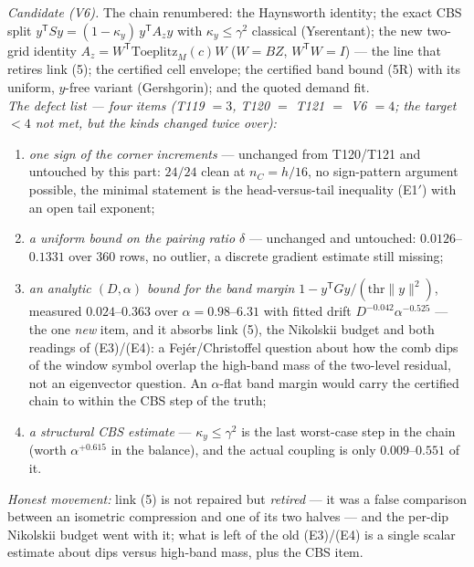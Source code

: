 \documentclass[11pt,a4paper]{article}
\begin{document}
\begin{keybox}
\emph{Candidate (V6).} The chain renumbered: the Haynsworth identity; the exact CBS split
$y^{\mathsf T}Sy=(1-\kappa_y)\,y^{\mathsf T}A_zy$ with $\kappa_y\le\gamma^2$ classical
(Yserentant); the new two-grid identity $A_z=W^{\mathsf T}\mathrm{Toeplitz}_M(c)W$ ($W=BZ$,
$W^{\mathsf T}W=I$) --- the line that retires link (5); the certified cell envelope; the
certified band bound (5R) with its uniform, $y$-free variant (Gershgorin); and the quoted
demand fit.\\[3pt]
\emph{The defect list --- four items (T119 $=3$, T120 $=$ T121 $=$ V6 $=4$; the target $<4$ not
met, but the kinds changed twice over):}
\begin{enumerate}[leftmargin=1.6em]
\item[\textbf{(F1)}] \emph{one sign of the corner increments} --- unchanged from T120/T121 and
untouched by this part: $24/24$ clean at $n_C=h/16$, no sign-pattern argument possible, the
minimal statement is the head-versus-tail inequality (E1$'$) with an open tail exponent;
\item[\textbf{(F2)}] \emph{a uniform bound on the pairing ratio $\delta$} --- unchanged and
untouched: $0.0126$--$0.1331$ over $360$ rows, no outlier, a discrete gradient estimate still
missing;
\item[\textbf{(F3)}] \emph{an analytic $(D,\alpha)$ bound for the band margin}
$1-y^{\mathsf T}Gy/(\mathrm{thr}\|y\|^2)$, measured $0.024$--$0.363$ over $\alpha=0.98$--$6.31$
with fitted drift $D^{-0.042}\alpha^{-0.525}$ --- the one \emph{new} item, and it absorbs link
(5), the Nikolskii budget and both readings of (E3)/(E4): a Fej\'er/Christoffel question about
how the comb dips of the window symbol overlap the high-band mass of the two-level residual,
not an eigenvector question. An $\alpha$-flat band margin would carry the certified chain to
within the CBS step of the truth;
\item[\textbf{(F4)}] \emph{a structural CBS estimate} --- $\kappa_y\le\gamma^2$ is the last
worst-case step in the chain (worth $\alpha^{+0.615}$ in the balance), and the actual coupling
is only $0.009$--$0.551$ of it.
\end{enumerate}
\emph{Honest movement:} link (5) is not repaired but \emph{retired} --- it was a false
comparison between an isometric compression and one of its two halves --- and the per-dip
Nikolskii budget went with it; what is left of the old (E3)/(E4) is a single scalar estimate
about dips versus high-band mass, plus the CBS item.\\[3pt]

\end{keybox}
\end{document}
